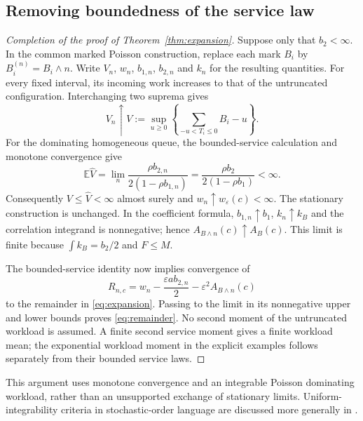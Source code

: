 \documentclass[aap,preprint]{imsart}
\numberwithin{equation}{section}
\theoremstyle{plain}
\theoremstyle{definition}
\newcommand{\E}{\mathbb E}
\newcommand{\1}{\mathbf 1}
\newcommand{\eps}{\varepsilon}
\begin{document}
\subsection{Removing boundedness of the service law}
\begin{proof}[Completion of the proof of Theorem~\ref{thm:expansion}]
Suppose only that $b_2<\infty$. In the common marked Poisson construction, replace each mark $B_i$ by $B_i^{(n)}=B_i\wedge n$. Write $V_n$, $w_n$, $b_{1,n}$, $b_{2,n}$ and $k_n$ for the resulting quantities. For every fixed interval, its incoming work increases to that of the untruncated configuration. Interchanging two suprema gives
\[
 V_n\uparrow V:=\sup_{u\ge0}\left\{\sum_{-u<T_i\le0}B_i-u\right\}.
\]
For the dominating homogeneous queue, the bounded-service calculation and monotone convergence give
\[
 \E\widehat V
 =\lim_n\frac{\rho b_{2,n}}{2(1-\rho b_{1,n})}
 =\frac{\rho b_2}{2(1-\rho b_1)}<\infty.
\]
Consequently $V\le\widehat V<\infty$ almost surely and $w_n\uparrow w_\eps(c)<\infty$. The stationary construction is unchanged. In the coefficient formula, $b_{1,n}\uparrow b_1$, $k_n\uparrow k_B$ and the correlation integrand is nonnegative; hence $A_{B\wedge n}(c)\uparrow A_B(c)$. This limit is finite because $\int k_B=b_2/2$ and $F\le M$.

The bounded-service identity now implies convergence of
\[
 R_{n,c}=w_n-\frac{\eps a b_{2,n}}2-\eps^2A_{B\wedge n}(c)
\]
to the remainder in \eqref{eq:expansion}. Passing to the limit in its nonnegative upper and lower bounds proves \eqref{eq:remainder}. No second moment of the untruncated workload is assumed. A finite second service moment gives a finite workload mean; the exponential workload moment in the explicit examples follows separately from their bounded service laws.
\end{proof}
This argument uses monotone convergence and an integrable Poisson dominating workload, rather than an unsupported exchange of stationary limits. Uniform-integrability criteria in stochastic-order language are discussed more generally in \cite{LV13}.
\end{document}
